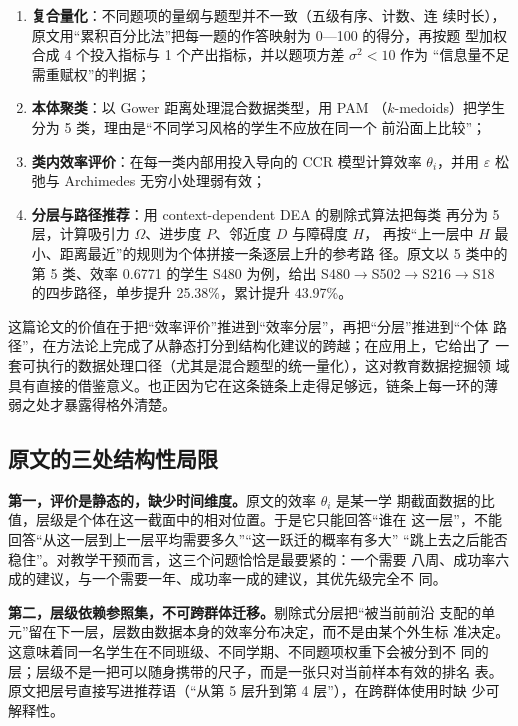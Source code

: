 \begin{enumerate}[label=（\arabic*）,itemsep=2pt,topsep=2pt,leftmargin=3em]
\item \textbf{复合量化}：不同题项的量纲与题型并不一致（五级有序、计数、连
  续时长），原文用“累积百分比法”把每一题的作答映射为 0—100 的得分，再按题
  型加权合成 4 个投入指标与 1 个产出指标，并以题项方差 $\sigma^2<10$ 作为
  “信息量不足需重赋权”的判据；
\item \textbf{本体聚类}：以 Gower 距离处理混合数据类型，用 PAM
  （$k$-medoids）把学生分为 5 类，理由是“不同学习风格的学生不应放在同一个
  前沿面上比较”；
\item \textbf{类内效率评价}：在每一类内部用投入导向的 CCR 模型计算效率
  $\theta_i$，并用 $\varepsilon$ 松弛与 Archimedes 无穷小处理弱有效；
\item \textbf{分层与路径推荐}：用 context-dependent DEA 的剔除式算法把每类
  再分为 5 层，计算吸引力 $\Omega$、进步度 $P$、邻近度 $D$ 与障碍度 $H$，
  再按“上一层中 $H$ 最小、距离最近”的规则为个体拼接一条逐层上升的参考路
  径。原文以 5 类中的第 5 类、效率 0.6771 的学生 S480 为例，给出
  S480$\to$S502$\to$S216$\to$S18 的四步路径，单步提升 25.38\%，累计提升
  43.97\%。
\end{enumerate}

这篇论文的价值在于把“效率评价”推进到“效率分层”，再把“分层”推进到“个体
路径”，在方法论上完成了从静态打分到结构化建议的跨越；在应用上，它给出了
一套可执行的数据处理口径（尤其是混合题型的统一量化），这对教育数据挖掘领
域具有直接的借鉴意义。也正因为它在这条链条上走得足够远，链条上每一环的薄
弱之处才暴露得格外清楚。

\subsection{原文的三处结构性局限}

\textbf{第一，评价是静态的，缺少时间维度。}原文的效率 $\theta_i$ 是某一学
期截面数据的比值，层级是个体在这一截面中的相对位置。于是它只能回答“谁在
这一层”，不能回答“从这一层到上一层平均需要多久”“这一跃迁的概率有多大”
“跳上去之后能否稳住”。对教学干预而言，这三个问题恰恰是最要紧的：一个需要
八周、成功率六成的建议，与一个需要一年、成功率一成的建议，其优先级完全不
同。

\textbf{第二，层级依赖参照集，不可跨群体迁移。}剔除式分层把“被当前前沿
支配的单元”留在下一层，层数由数据本身的效率分布决定，而不是由某个外生标
准决定。这意味着同一名学生在不同班级、不同学期、不同题项权重下会被分到不
同的层；层级不是一把可以随身携带的尺子，而是一张只对当前样本有效的排名
表。原文把层号直接写进推荐语（“从第 5 层升到第 4 层”），在跨群体使用时缺
少可解释性。

